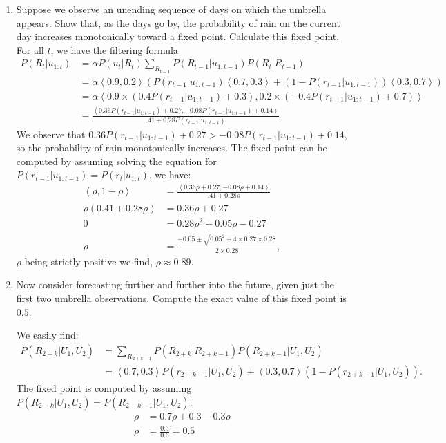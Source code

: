 \documentclass[9pt,a4paper]{extarticle}
\newenvironment{solution}
    {%
    \color{red}
    }
    { 
    \color{black}
    }
\begin{document}
    \begin{enumerate}
        \item Suppose we observe an unending sequence of days on which the umbrella appears. Show that, as the days go by, the probability of rain on the current day increases monotonically toward a fixed point. Calculate this fixed point.
        \begin{solution}\\
        For all $t$, we have the filtering formula
        \begin{align}
            P(R_t|u_{1:t}) &= \alpha P(u_t|R_t) \sum_{R_{t-1}} P(R_{t-1}|u_{1:t-1}) P(R_t|R_{t-1})\\
            &= \alpha \left<0.9, 0.2\right> (P(r_{t-1}|u_{1:t-1})\left<0.7, 0.3\right> + (1 - P(r_{t-1}|u_{1:t-1}))\left<0.3, 0.7\right>)\\
            &=\alpha \left<0.9\times (0.4P(r_{t-1}|u_{1:t-1}) + 0.3), 0.2\times(-0.4P(r_{t-1}|u_{1:t-1}) + 0.7)\right>\\
            &= \frac{\left<0.36 P(r_{t-1}|u_{1:t-1}) + 0.27, -0.08P(r_{t-1}|u_{1:t-1}) + 0.14\right>}{.41 + 0.28P(r_{t-1}|u_{1:t-1}) }
        \end{align}
        We observe that $0.36 P(r_{t-1}|u_{1:t-1}) + 0.27 > -0.08P(r_{t-1}|u_{1:t-1}) + 0.14$, so the probability of rain monotonically increases.
        The fixed point can be computed by assuming solving the equation for $P(r_{t-1}|u_{1:t-1}) = P(r_{t}|u_{1:t})$, we have:
        \begin{align}
            \left<\rho, 1-\rho\right> &= \frac{\left<0.36 \rho + 0.27, -0.08\rho + 0.14\right>}{.41 + 0.28\rho }\\
            \rho (0.41 + 0.28 \rho)&= 0.36 \rho + 0.27\\
            0 &= 0.28\rho^2 + 0.05\rho - 0.27\\
            \rho &= \frac{-0.05 \pm \sqrt{0.05^2 + 4 \times 0.27 \times 0.28}}{2 \times 0.28},
        \end{align}
        $\rho$ being strictly positive we find, $\rho \approx 0.89$.
        \end{solution}
        \item Now consider forecasting further and further into the future, given just the first two umbrella observations. Compute the exact value of this fixed point is $0.5$.
        \begin{solution}
        We easily find:
        \begin{align}
            P(R_{2+k}|U_1, U_2) &= \sum_{R_{2+k-1}}P(R_{2+k}|R_{2+k-1})P(R_{2+k-1}|U_1, U_2)\\
            &=\left<0.7, 0.3\right>P(r_{2+k-1}|U_1, U_2) + \left<0.3, 0.7\right>(1-P(r_{2+k-1}|U_1, U_2)).
        \end{align}
        The fixed point is computed by assuming $P(R_{2+k}|U_1, U_2) = P(R_{2+k-1}|U_1, U_2)$:
        \begin{align}
            \rho &= 0.7\rho + 0.3 - 0.3\rho\\
            \rho &= \frac{0.3}{0.6} = 0.5
        \end{align}
        \end{solution}
    \end{enumerate}
\end{document}
